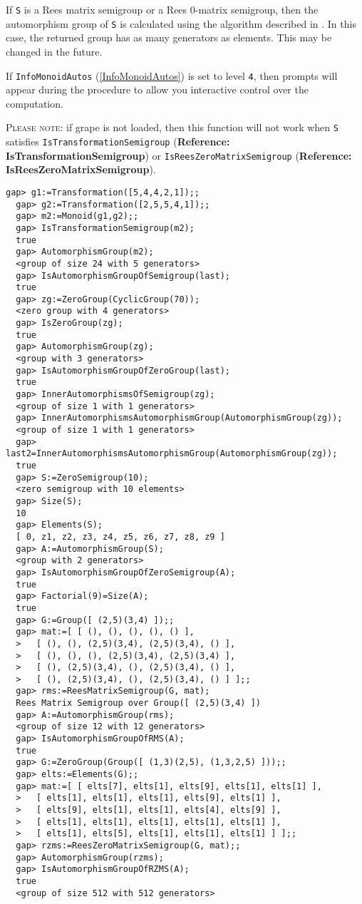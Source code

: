 \documentclass[a4paper,11pt]{report}
\begin{document}
{{{ If \texttt{S} is a Rees matrix semigroup or a Rees 0-matrix semigroup, then the automorphism
group of \texttt{S} is calculated using the algorithm described in \cite[Section 2]{computing}. In this case, the returned group has as many generators as elements. This
may be changed in the future.

 If \texttt{InfoMonoidAutos} (\ref{InfoMonoidAutos}) is set to level \texttt{4}, then prompts will appear during the procedure to allow you interactive
control over the computation. 

 \textsc{Please note:} if \textsf{grape} is not loaded, then this function will not work when \texttt{S} satisfies \texttt{IsTransformationSemigroup} (\textbf{Reference: IsTransformationSemigroup}) or \texttt{IsReesZeroMatrixSemigroup} (\textbf{Reference: IsReesZeroMatrixSemigroup}). 
\begin{Verbatim}[fontsize=\small,frame=single,label=Example]
  gap> g1:=Transformation([5,4,4,2,1]);;
  gap> g2:=Transformation([2,5,5,4,1]);;
  gap> m2:=Monoid(g1,g2);;
  gap> IsTransformationSemigroup(m2);
  true
  gap> AutomorphismGroup(m2);
  <group of size 24 with 5 generators>
  gap> IsAutomorphismGroupOfSemigroup(last);
  true
  gap> zg:=ZeroGroup(CyclicGroup(70));
  <zero group with 4 generators>
  gap> IsZeroGroup(zg);
  true
  gap> AutomorphismGroup(zg);
  <group with 3 generators>
  gap> IsAutomorphismGroupOfZeroGroup(last);
  true
  gap> InnerAutomorphismsOfSemigroup(zg);
  <group of size 1 with 1 generators>
  gap> InnerAutomorphismsAutomorphismGroup(AutomorphismGroup(zg));
  <group of size 1 with 1 generators>
  gap> last2=InnerAutomorphismsAutomorphismGroup(AutomorphismGroup(zg));
  true
  gap> S:=ZeroSemigroup(10);
  <zero semigroup with 10 elements>
  gap> Size(S);
  10
  gap> Elements(S);
  [ 0, z1, z2, z3, z4, z5, z6, z7, z8, z9 ]
  gap> A:=AutomorphismGroup(S);
  <group with 2 generators>
  gap> IsAutomorphismGroupOfZeroSemigroup(A);
  true
  gap> Factorial(9)=Size(A);
  true
  gap> G:=Group([ (2,5)(3,4) ]);;
  gap> mat:=[ [ (), (), (), (), () ], 
  >   [ (), (), (2,5)(3,4), (2,5)(3,4), () ], 
  >   [ (), (), (), (2,5)(3,4), (2,5)(3,4) ], 
  >   [ (), (2,5)(3,4), (), (2,5)(3,4), () ], 
  >   [ (), (2,5)(3,4), (), (2,5)(3,4), () ] ];;
  gap> rms:=ReesMatrixSemigroup(G, mat);
  Rees Matrix Semigroup over Group([ (2,5)(3,4) ])
  gap> A:=AutomorphismGroup(rms);
  <group of size 12 with 12 generators>
  gap> IsAutomorphismGroupOfRMS(A);
  true
  gap> G:=ZeroGroup(Group([ (1,3)(2,5), (1,3,2,5) ]));;
  gap> elts:=Elements(G);;
  gap> mat:=[ [ elts[7], elts[1], elts[9], elts[1], elts[1] ], 
  >   [ elts[1], elts[1], elts[1], elts[9], elts[1] ], 
  >   [ elts[9], elts[1], elts[1], elts[4], elts[9] ], 
  >   [ elts[1], elts[1], elts[1], elts[1], elts[1] ], 
  >   [ elts[1], elts[5], elts[1], elts[1], elts[1] ] ];;
  gap> rzms:=ReesZeroMatrixSemigroup(G, mat);;
  gap> AutomorphismGroup(rzms);
  gap> IsAutomorphismGroupOfRZMS(A);
  true
  <group of size 512 with 512 generators>
  	

\end{Verbatim}}}}
\end{document}
